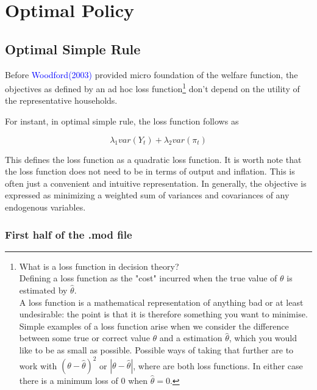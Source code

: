 \documentclass[10pt,math=newtx,citestyle=gb7714-2015,bibstyle=gb7714-2015]{elegantbook}
\begin{document}
{	\section{Optimal Policy}
	
	\subsection{Optimal Simple Rule}
	
	Before \textcolor{blue}{Woodford(2003)} provided micro foundation of the welfare function, the objectives as defined by an ad hoc loss function\footnote{What is a loss function in decision theory?\\Defining a loss function as the "cost" incurred when the true value of $\theta$ is estimated by $\hat{\theta}$.\\A loss function is a mathematical representation of anything bad or at least undesirable: the point is that it is therefore something you want to minimise. Simple examples of a loss function arise when we consider the difference between some true or correct value $\theta$ and a estimation $\hat{\theta}$, which you would like to be as small as possible. Possible ways of taking that further are to work with $(\theta-\hat{\theta})^2$ or $|\theta-\hat{\theta}|$, where are both loss functions. In either case there is a minimum loss of 0 when $\hat{\theta}=0$.} don't depend on the utility of the representative households.
	
	For instant, in optimal simple rule, the loss function follows as
	
	$$\lambda_1 var(Y_t)+\lambda_2 var(\pi_t)$$
	
	This defines the loss function as a quadratic loss function. It is worth note that the loss function does not need to be in terms of output and inflation. This is often just a convenient and intuitive representation. In generally, the objective is expressed as minimizing a weighted sum of variances and covariances of any endogenous variables.
	
	\subsubsection{First half of the .mod file}
	
}
\end{document}
